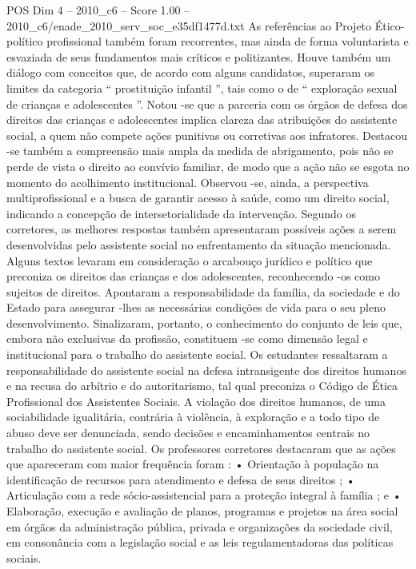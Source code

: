 \begin{textsample}{POS Dim 4 – 2010\_c6 – Score 1.00 – 2010\_c6/enade\_2010\_serv\_soc\_e35df1477d.txt}
As referências ao Projeto Ético-político profissional também foram recorrentes, mas ainda de forma voluntarista e esvaziada de seus fundamentos mais críticos e politizantes.
Houve também um diálogo com conceitos que, de acordo com alguns candidatos, superaram os limites da categoria “ prostituição infantil ”, tais como o de “ exploração sexual de crianças e adolescentes ”.
Notou -se que a parceria com os órgãos de defesa dos direitos das crianças e adolescentes implica clareza das atribuições do assistente social, a quem não compete ações punitivas ou corretivas aos infratores.
Destacou -se também a compreensão mais ampla da medida de abrigamento, pois não se perde de vista o direito ao convívio familiar, de modo que a ação não se esgota no momento do acolhimento institucional.
Observou -se, ainda, a perspectiva multiprofissional e a busca de garantir acesso à saúde, como um direito social, indicando a concepção de intersetorialidade da intervenção.
Segundo os corretores, as melhores respostas também apresentaram possíveis ações a serem desenvolvidas pelo assistente social no enfrentamento da situação mencionada.
Alguns textos levaram em consideração o arcabouço jurídico e político que preconiza os direitos das crianças e dos adolescentes, reconhecendo -os como sujeitos de direitos.
Apontaram a responsabilidade da família, da sociedade e do Estado para assegurar -lhes as necessárias condições de vida para o seu pleno desenvolvimento.
Sinalizaram, portanto, o conhecimento do conjunto de leis que, embora não exclusivas da profissão, constituem -se como dimensão legal e institucional para o trabalho do assistente social.
Os estudantes ressaltaram a responsabilidade do assistente social na defesa intransigente dos direitos humanos e na recusa do arbítrio e do autoritarismo, tal qual preconiza o Código de Ética Profissional dos Assistentes Sociais.
A violação dos direitos humanos, de uma sociabilidade igualitária, contrária à violência, à exploração e a todo tipo de abuso deve ser denunciada, sendo decisões e encaminhamentos centrais no trabalho do assistente social.
Os professores corretores destacaram que as ações que apareceram com maior frequência foram : • Orientação à população na identificação de recursos para atendimento e defesa de seus direitos ; • Articulação com a rede sócio-assistencial para a proteção integral à família ; e • Elaboração, execução e avaliação de planos, programas e projetos na área social em órgãos da administração pública, privada e organizações da sociedade civil, em consonância com a legislação social e as leis regulamentadoras das políticas sociais.

\end{textsample}
